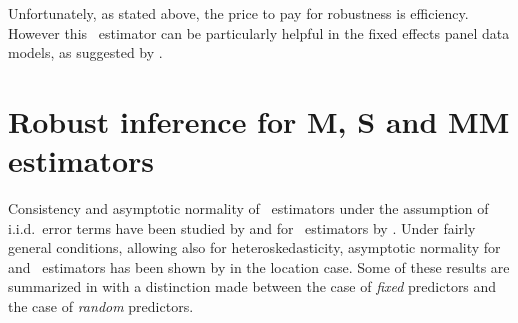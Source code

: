 Unfortunately, as stated above, the price to pay for robustness is efficiency.
However this ~estimator can be particularly helpful in the fixed
effects panel data models, as suggested by \citet{bramati:croux:2007}.

\section{Robust inference for M, S and MM estimators}
\label{sec:inference}

Consistency and asymptotic normality of ~estimators under the
assumption of i.i.d.\ error terms have been studied by \citet{Yohai:1979} and
for ~estimators by \citet{yohai:1987}. Under fairly general
conditions, allowing also for heteroskedasticity, asymptotic normality for
 and ~estimators has been shown by
\citet{Salibian-Barrera:2004} in the location case. Some of these results are
summarized in \citet{maronna:etal:2006} with a distinction made between the
case of \emph{fixed} predictors and the case of \emph{random} predictors.

